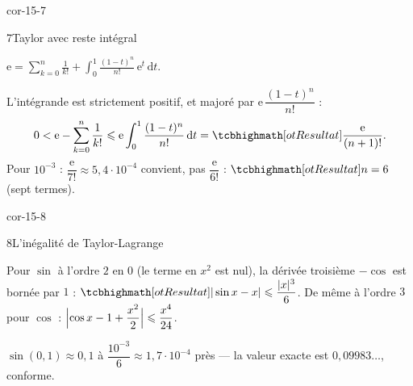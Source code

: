 \begin{blocLivre}{cor-15-7}
\begin{corrige}{7}{Taylor avec reste intégral}
\begin{questions}
  \item $\mathrm{e}=\displaystyle\sum_{k=0}^{n}\frac{1}{k!}
    +\int_{0}^{1}\frac{(1-t)^{n}}{n!}\,\mathrm{e}^{t}\,\mathrm{d}t$.
  \item L'intégrande est strictement positif, et majoré par
    $\mathrm{e}\,\dfrac{(1-t)^{n}}{n!}$ :
    \[
    0<\mathrm{e}-\sum_{k=0}^{n}\frac{1}{k!}
    \leqslant\mathrm{e}\int_{0}^{1}\frac{(1-t)^{n}}{n!}\,\mathrm{d}t
    =\res{\frac{\mathrm{e}}{(n+1)!}} .
    \]
    Pour $10^{-3}$ : $\dfrac{\mathrm{e}}{7!}\approx5{,}4\cdot10^{-4}$
    convient, pas $\dfrac{\mathrm{e}}{6!}$ : $\res{n=6}$ (sept termes).
\end{questions}
\end{corrige}
\end{blocLivre}

\begin{blocLivre}{cor-15-8}
\begin{corrige}{8}{L'inégalité de Taylor-Lagrange}
\begin{questions}
  \item Pour $\sin$ à l'ordre $2$ en $0$ (le terme en $x^{2}$ est nul), la
    dérivée troisième $-\cos$ est bornée par $1$ :
    $\res{|\sin x-x|\leqslant\dfrac{|x|^{3}}{6}}$. De même à l'ordre $3$
    pour $\cos$ :
    $\Bigl|\cos x-1+\dfrac{x^{2}}{2}\Bigr|\leqslant\dfrac{x^{4}}{24}$.
  \item $\sin(0{,}1)\approx0{,}1$ à
    $\dfrac{10^{-3}}{6}\approx1{,}7\cdot10^{-4}$ près — la valeur exacte
    est $0{,}09983\ldots$, conforme.
\end{questions}
\end{corrige}
\end{blocLivre}

